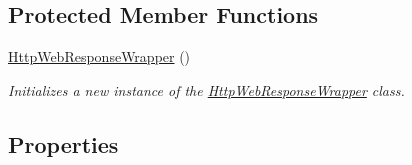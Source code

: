 \subsection*{Protected Member Functions}
\begin{DoxyCompactItemize}
\item 
\hyperlink{class_accela_1_1_windows_store_s_d_k_1_1_http_web_response_wrapper_a5aa72bc91c7ae5f4857dbef8f719f1d2}{Http\+Web\+Response\+Wrapper} ()
\begin{DoxyCompactList}\small\item\em Initializes a new instance of the \hyperlink{class_accela_1_1_windows_store_s_d_k_1_1_http_web_response_wrapper}{Http\+Web\+Response\+Wrapper} class. \end{DoxyCompactList}\end{DoxyCompactItemize}
\subsection*{Properties}
